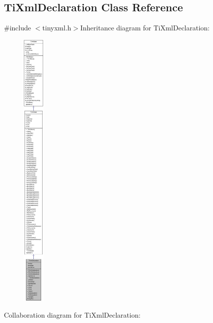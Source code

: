 \hypertarget{class_ti_xml_declaration}{
\subsection{TiXmlDeclaration Class Reference}
\label{class_ti_xml_declaration}
}


{\ttfamily \#include $<$tinyxml.h$>$}Inheritance diagram for TiXmlDeclaration:\nopagebreak
\begin{figure}[H]
\begin{center}
\leavevmode
\includegraphics[height=400pt]{class_ti_xml_declaration__inherit__graph}
\end{center}
\end{figure}
Collaboration diagram for TiXmlDeclaration:\nopagebreak
